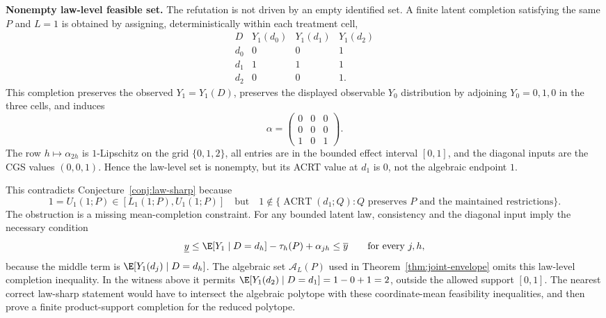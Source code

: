 \textbf{Nonempty law-level feasible set.} The refutation is not driven by an
empty identified set.  A finite latent completion satisfying the same \(P\)
and \(L=1\) is obtained by assigning, deterministically within each treatment
cell,
\[
\begin{array}{c|ccc}
  D & Y_1(d_0) & Y_1(d_1) & Y_1(d_2)\\ \hline
  d_0 & 0&0&1\\
  d_1 & 1&1&1\\
  d_2 & 0&0&1.
\end{array}
\]
This completion preserves the observed \(Y_1=Y_1(D)\), preserves the displayed
observable \(Y_0\) distribution by adjoining \(Y_0=0,1,0\) in the three cells,
and induces
\[
  \alpha=
  \begin{pmatrix}
    0&0&0\\
    0&0&0\\
    1&0&1
  \end{pmatrix}.
\]
The row \(h\mapsto\alpha_{2h}\) is \(1\)-Lipschitz on the grid
\(\{0,1,2\}\), all entries are in the bounded effect interval \([0,1]\), and
the diagonal inputs are the CGS values \((0,0,1)\).  Hence the law-level set is
nonempty, but its ACRT value at \(d_1\) is \(0\), not the algebraic endpoint
\(1\).

This contradicts Conjecture~\ref{conj:law-sharp} because
\[
  1=U_1(1;P)\in [L_1(1;P),U_1(1;P)]
  \quad\text{but}\quad
  1\notin
  \{\operatorname{ACRT}(d_1;Q):Q \text{ preserves }P
  \text{ and the maintained restrictions}\}.
\]
The obstruction is a missing mean-completion constraint.  For any bounded
latent law, consistency and the diagonal input imply the necessary condition
\[
  \underline y
  \le
  \E[Y_1\mid D=d_h]-\tau_h(P)+\alpha_{jh}
  \le
  \overline y
  \qquad\text{for every }j,h,
\]
because the middle term is
\(\E[Y_1(d_j)\mid D=d_h]\).  The algebraic set
\(\mathcal A_L(P)\) used in Theorem~\ref{thm:joint-envelope} omits this
law-level completion inequality.  In the witness above it permits
\(\E[Y_1(d_2)\mid D=d_1]=1-0+1=2\), outside the allowed support \([0,1]\).
The nearest correct law-sharp statement would have to intersect the algebraic
polytope with these coordinate-mean feasibility inequalities, and then prove
a finite product-support completion for the reduced polytope.
